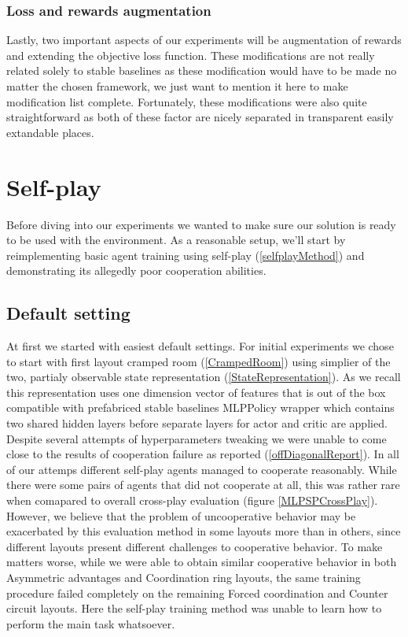 \subsubsection*{Loss and rewards augmentation}
Lastly, two important aspects of our experiments will be augmentation of rewards and extending the objective loss function.
These modifications are not really related solely to stable baselines as these modification would have to be made no matter the chosen framework, we just want to mention it here to make modification list complete. 
Fortunately, these modifications were also quite straightforward as both of these factor are nicely separated in transparent easily extandable places.

\section{Self-play}
Before diving into our experiments we wanted to make sure our solution is ready to be used with the environment.
As a reasonable setup, we'll start by reimplementing basic agent training using self-play (\ref{selfplayMethod}) and demonstrating its allegedly poor cooperation abilities.


\subsection*{Default setting}
At first we started with easiest default settings.
For initial experiments we chose to start with first layout cramped room (\ref{CrampedRoom}) using simplier of the two, partialy observable state representation (\ref{StateRepresentation}).
As we recall this representation uses one dimension vector of features that is out of the box compatible with prefabriced stable baselines MLPPolicy wrapper which contains two shared hidden layers before separate layers for actor and critic are applied.
Despite several attempts of hyperparameters tweaking we were unable to come close to the results of cooperation failure as reported (\ref{offDiagonalReport}).
In all of our attemps different self-play agents managed to cooperate reasonably.
While there were some pairs of agents that did not cooperate at all, this was rather rare when comapared to overall cross-play evaluation (figure \ref{MLPSPCrossPlay}).
However, we believe that the problem of uncooperative behavior may be exacerbated by this evaluation method in some layouts more than in others, since different layouts present different challenges to cooperative behavior.
To make matters worse, while we were able to obtain similar cooperative behavior in both Asymmetric advantages and Coordination ring layouts, the same training procedure failed completely on the remaining Forced coordination and Counter circuit layouts.
Here the self-play training method was unable to learn how to perform the main task whatsoever.

